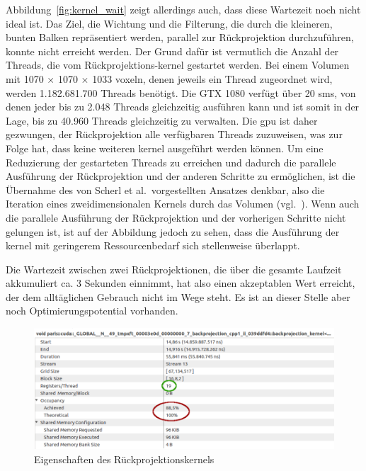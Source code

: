 Abbildung~\ref{fig:kernel_wait} zeigt allerdings auch, dass diese Wartezeit noch nicht ideal ist. Das Ziel, die Wichtung
und die Filterung, die durch die kleineren, bunten Balken repräsentiert werden, parallel zur Rückprojektion
durchzuführen, konnte nicht erreicht werden. Der Grund dafür ist vermutlich die Anzahl der Threads, die vom
Rückprojektions-\gls{kernel} gestartet werden. Bei einem Volumen mit 1070 $\times$ 1070 $\times$ 1033 \gls{voxel}n,
denen jeweils ein Thread zugeordnet wird, werden 1.182.681.700 Threads benötigt. Die GTX 1080 verfügt über 20 \gls{sm}s,
von denen jeder bis zu 2.048 Threads gleichzeitig ausführen kann und ist somit in der Lage, bis zu 40.960 Threads
gleichzeitig zu verwalten. Die \gls{gpu} ist daher gezwungen, der Rückprojektion alle verfügbaren Threads zuzuweisen,
was zur Folge hat, dass keine weiteren \gls{kernel} ausgeführt werden können. Um eine Reduzierung der gestarteten
Threads zu erreichen und dadurch die parallele Ausführung der Rückprojektion und der anderen Schritte zu ermöglichen,
ist die Übernahme des von Scherl et al.\ vorgestellten Ansatzes denkbar, also die Iteration eines zweidimensionalen
Kernels durch das Volumen (vgl.~\cite{scherlkeck}). Wenn auch die parallele Ausführung der Rückprojektion und der
vorherigen Schritte nicht gelungen ist, ist auf der Abbildung jedoch zu sehen, dass die Ausführung der \gls{kernel} mit
geringerem Ressourcenbedarf sich stellenweise überlappt.

Die Wartezeit zwischen zwei Rückprojektionen, die über die gesamte Laufzeit akkumuliert ca. 3 Sekunden einnimmt, hat
also einen akzeptablen Wert erreicht, der dem alltäglichen Gebrauch nicht im Wege steht. Es ist an dieser Stelle aber
noch Optimierungspotential vorhanden.

\begin{figure}
    \includegraphics[width=\linewidth]{img/kernel_properties}
    \caption{Eigenschaften des Rückprojektionskernels\label{fig:kernel_props}} 
\end{figure}

